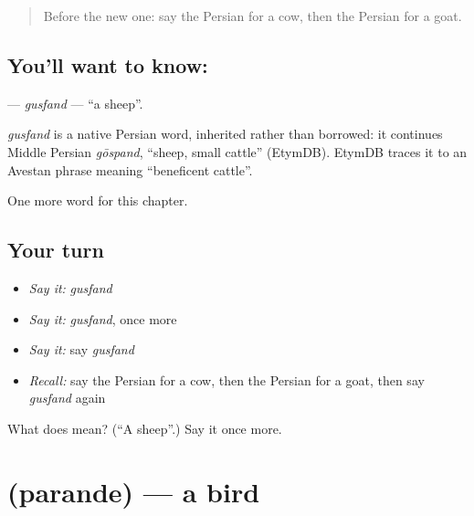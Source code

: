 \label{lesson:FA-C55-gusfand}



\begin{quote}
Before the new one: say the Persian for a cow, then the Persian for a goat.
\end{quote}

\subsection*{You'll want to know: }
\textbf{} — \emph{gusfand} — \textquotedblleft{}a sheep\textquotedblright{}.

\begin{cousinweb}
\emph{gusfand} is a native Persian word, inherited rather than borrowed: it continues Middle Persian \emph{gōspand}, \textquotedblleft{}sheep, small cattle\textquotedblright{} (EtymDB). EtymDB traces it to an Avestan phrase meaning \textquotedblleft{}beneficent cattle\textquotedblright{}.
\end{cousinweb}

\begin{grammarlens}[title={What you've built}]
One more word for this chapter.
\end{grammarlens}

\subsection*{Your turn}
\begin{itemize}
\raggedright
  \item \emph{Say it:} \emph{gusfand}
  \item \emph{Say it:} \emph{gusfand}, once more
  \item \emph{Say it:} say \emph{gusfand}
  \item \emph{Recall:} say the Persian for a cow, then the Persian for a goat, then say \emph{gusfand} again
\end{itemize}

\begin{tcolorbox}[breakable,colback=teal!4,colframe=teal!35!black,title={Before you move on}]
What does  mean? (\textquotedblleft{}A sheep\textquotedblright{}.) Say it once more.
\end{tcolorbox}
\section[\texorpdfstring{\fa{پرنده} (parande)}{پرنده (parande)}]{ (parande) — a bird}

